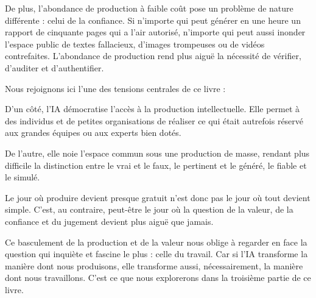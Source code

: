 De plus, l'abondance de production à faible coût pose un problème de nature différente : celui de la confiance. Si n'importe qui peut générer en une heure un rapport de cinquante pages qui a l'air autorisé, n'importe qui peut aussi inonder l'espace public de textes fallacieux, d'images trompeuses ou de vidéos contrefaites. L'abondance de production rend plus aiguë la nécessité de vérifier, d'auditer et d'authentifier.

Nous rejoignons ici l'une des tensions centrales de ce livre :

\begin{eplist}
\item D'un côté, l'IA démocratise l'accès à la production intellectuelle. Elle permet à des individus et de petites organisations de réaliser ce qui était autrefois réservé aux grandes équipes ou aux experts bien dotés.
\item De l'autre, elle noie l'espace commun sous une production de masse, rendant plus difficile la distinction entre le vrai et le faux, le pertinent et le généré, le fiable et le simulé.
\end{eplist}
Le jour où produire devient presque gratuit n'est donc pas le jour où tout devient simple. C'est, au contraire, peut-être le jour où la question de la valeur, de la confiance et du jugement devient plus aiguë que jamais.

Ce basculement de la production et de la valeur nous oblige à regarder en face la question qui inquiète et fascine le plus : celle du travail. Car si l'IA transforme la manière dont nous produisons, elle transforme aussi, nécessairement, la manière dont nous travaillons. C'est ce que nous explorerons dans la troisième partie de ce livre.
